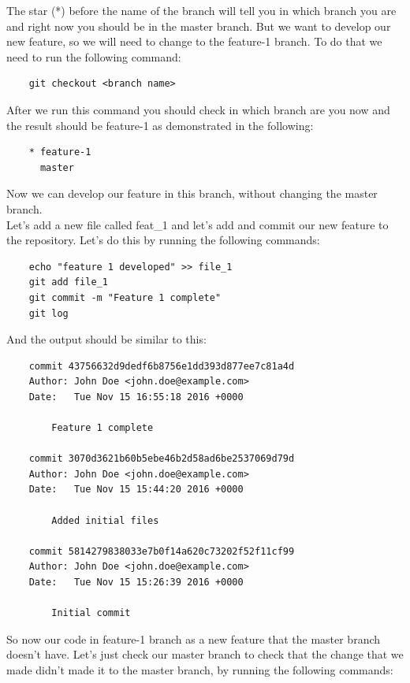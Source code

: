 \documentclass{article}
\begin{document}
The star (*) before the name of the branch will tell you in which branch you are and right now you should be in the master branch. But we want to develop our new feature, so we will need to change to the feature-1 branch. To do that we need to run the following command:

\begin{lstlisting}
	git checkout <branch name>
\end{lstlisting}

After we run this command you should check in which branch are you now and the result should be feature-1 as demonstrated in the following:

\begin{lstlisting}
	* feature-1
	  master
\end{lstlisting}

Now we can develop our feature in this branch, without changing the master branch.\\
Let's add a new file called feat\_1 and let's add and commit our new feature to the repository. Let's do this by running the following commands:

\begin{lstlisting}
	echo "feature 1 developed" >> file_1
	git add file_1
	git commit -m "Feature 1 complete"
	git log
\end{lstlisting}

And the output should be similar to this:

\begin{lstlisting}
	commit 43756632d9dedf6b8756e1dd393d877ee7c81a4d
	Author: John Doe <john.doe@example.com>
	Date:   Tue Nov 15 16:55:18 2016 +0000

    	Feature 1 complete

	commit 3070d3621b60b5ebe46b2d58ad6be2537069d79d
	Author: John Doe <john.doe@example.com>
	Date:   Tue Nov 15 15:44:20 2016 +0000

    	Added initial files

	commit 5814279838033e7b0f14a620c73202f52f11cf99
	Author: John Doe <john.doe@example.com>
	Date:   Tue Nov 15 15:26:39 2016 +0000

    	Initial commit
\end{lstlisting}

So now our code in feature-1 branch as a new feature that the master branch doesn't have. Let's just check our master branch to check that the change that we made didn't made it to the master branch, by running the following commands:
\end{document}

